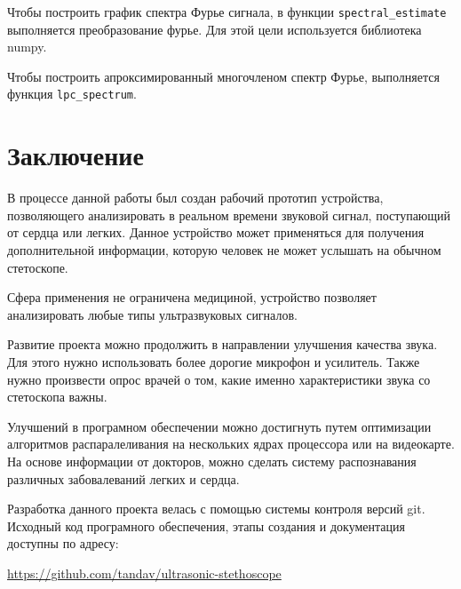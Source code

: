 Чтобы построить график спектра Фурье сигнала, в функции \verb|spectral_estimate| выполняется преобразование фурье. Для этой цели используется библиотека numpy.

Чтобы построить апроксимированный многочленом спектр Фурье, выполняется функция \verb|lpc_spectrum|.

\newpage
\section{Заключение}
В процессе данной работы был создан рабочий прототип устройства, позволяющего анализировать в реальном времени звуковой сигнал, поступающий от сердца или легких. Данное устройство может применяться для получения дополнительной информации, которую человек не может услышать на обычном стетоскопе.

Сфера применения не ограничена медициной, устройство позволяет анализировать любые типы ультразвуковых сигналов.

Развитие проекта можно продолжить в направлении улучшения качества звука. Для этого нужно использовать более дорогие микрофон и усилитель. Также нужно произвести опрос врачей о том, какие именно характеристики звука со стетоскопа важны.

Улучшений в програмном обеспечении можно достигнуть путем оптимизации алгоритмов распаралеливания на нескольких ядрах процессора или на видеокарте. На основе информации от докторов, можно сделать систему распознавания различных забовалеваний легких и сердца.

Разработка данного проекта велась с помощью системы контроля версий git. Исходный код програмного обеспечения, этапы создания и документация доступны по адресу:

\url{https://github.com/tandav/ultrasonic-stethoscope}

